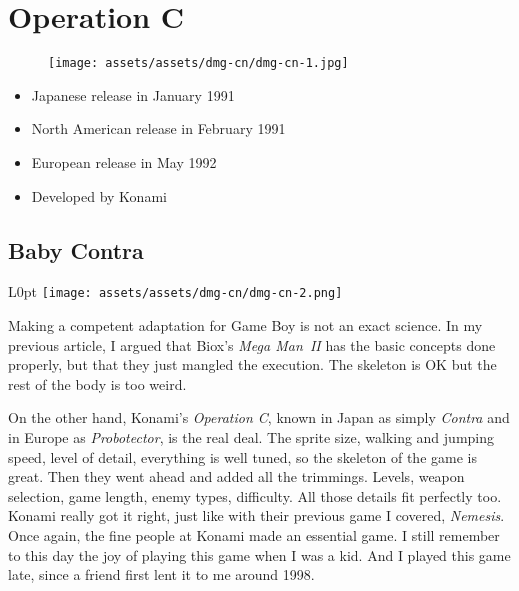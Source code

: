 \documentclass{book}
\begin{document}
\begingroup \chapter*{Operation C} \endgroup
\begin{figure}[H]
\vskip 4pt
\centering
\texttt{[image: assets/assets/dmg-cn/dmg-cn-1.jpg]}\end{figure}
\begin{itemize} [nosep]




\item Japanese release in January 1991







\item North American release in February 1991







\item European release in May 1992












\item Developed by Konami

\end{itemize}\noindent

\newpage\FloatBarrier\needspace{10mm}\section*{Baby Contra}\nopagebreak[4]
\begin{wrapfigure}{L}{0pt} \texttt{[image: assets/assets/dmg-cn/dmg-cn-2.png]}\end{wrapfigure}
Making a competent adaptation for Game Boy is not an exact science. In my previous article, I argued that Biox’s \emph{Mega Man~II} has the basic concepts done properly, but that they just mangled the execution. The skeleton is OK but the rest of the body is too weird.

On the other hand, Konami’s \emph{Operation C}, known in Japan as simply \emph{Contra} and in Europe as \emph{Probotector}, is the real deal. The sprite size, walking and jumping speed, level of detail, everything is well tuned, so the skeleton of the game is great. Then they went ahead and added all the trimmings. Levels, weapon selection, game length, enemy types, difficulty. All those details fit perfectly too. Konami really got it right, just like with their previous game I covered, \emph{Nemesis}. Once again, the fine people at Konami made an essential game. I still remember to this day the joy of playing this game when I was a kid. And I played this game late, since a friend first lent it to me around 1998.
\end{document}
